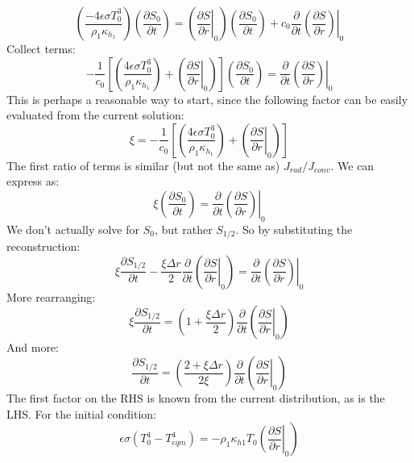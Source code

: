 \begin{equation}
\left( \frac{-4 \epsilon \sigma T_0^3}{\rho_1 \kappa_{h_1}} \right) \left(\frac{\partial S_0}{\partial t} \right) = \left(\left.\frac{\partial S}{\partial r}\right|_0 \right) \left( \frac{\partial S_0}{\partial t} \right) + c_0 \frac{\partial}{\partial t} \left. \left(\frac{\partial S}{\partial r}\right) \right|_0
\end{equation}
Collect terms:
\begin{equation}
-\frac{1}{c_0} \left[ \left( \frac{4 \epsilon \sigma T_0^3}{\rho_1 \kappa_{h_1}} \right) + \left(\left.\frac{\partial S}{\partial r}\right|_0 \right) \right] \left(\frac{\partial S_0}{\partial t} \right) = \frac{\partial}{\partial t} \left. \left(\frac{\partial S}{\partial r}\right) \right|_0
\end{equation}
This is perhaps a reasonable way to start, since the following factor can be easily evaluated from the current solution:
\begin{equation}
\xi = -\frac{1}{c_0} \left[ \left( \frac{4 \epsilon \sigma T_0^3}{\rho_1 \kappa_{h_1}} \right) + \left(\left.\frac{\partial S}{\partial r}\right|_0 \right) \right] 
\end{equation}
The first ratio of terms is similar (but not the same as) $J_{rad}/J_{conv}$.  We can express as:
\begin{equation}
\xi \left(\frac{\partial S_0}{\partial t} \right) = \frac{\partial}{\partial t} \left. \left(\frac{\partial S}{\partial r}\right) \right|_0
\end{equation}
We don't actually solve for $S_0$, but rather $S_{1/2}$.  So by substituting the reconstruction:
\begin{equation}
\xi \frac{\partial S_{1/2}}{\partial t} - \frac{\xi \Delta r}{2} \frac{\partial}{\partial t} \left( \left. \frac{\partial S}{\partial r}\right|_0 \right) = \frac{\partial}{\partial t} \left. \left(\frac{\partial S}{\partial r}\right) \right|_0
\end{equation}
More rearranging:
\begin{equation}
\xi \frac{\partial S_{1/2}}{\partial t} = \left(1 + \frac{\xi \Delta r}{2} \right) \frac{\partial}{\partial t} \left( \left. \frac{\partial S}{\partial r}\right|_0 \right)
\end{equation}
And more:
\begin{equation}
\frac{\partial S_{1/2}}{\partial t} = \left(\frac{2 + \xi \Delta r}{2 \xi} \right) \frac{\partial}{\partial t} \left( \left. \frac{\partial S}{\partial r}\right|_0 \right)
\label{eq:surfbc}
\end{equation}
The first factor on the RHS is known from the current distribution, as is the LHS.  For the initial condition:
\begin{equation}
\epsilon \sigma (T_0^4 - T_{eqm}^4) = -\rho_1 \kappa_{h1} T_0 \left. \left( \frac{\partial S}{\partial r} \right|_0 \right)
\end{equation}


